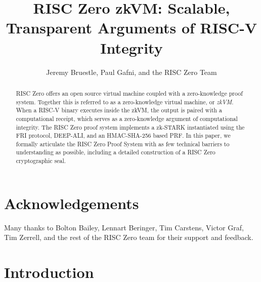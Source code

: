 \documentclass[10pt,letterpaper,titlepage]{article}
\author{Jeremy Bruestle, Paul Gafni, and the RISC Zero Team}
\title{RISC Zero zkVM: Scalable, Transparent Arguments of RISC-V Integrity}
\theoremstyle{definition}
\begin{document}
\maketitle
\begin{abstract}
RISC Zero offers an open source virtual machine coupled with a zero-knowledge proof system.
Together this is referred to as a zero-knowledge virtual machine, or \textit{zkVM}.
When a RISC-V binary executes inside the zkVM, the output is paired with a computational receipt, which serves as a zero-knowledge argument of computational integrity.
The RISC Zero proof system implements a zk-STARK instantiated using the FRI protocol, DEEP-ALI, and an HMAC-SHA-256 based PRF. 
In this paper, we formally articulate the RISC Zero Proof System with as few technical barriers to understanding as possible, including a detailed construction of a RISC Zero cryptographic seal.
\end{abstract}

\tableofcontents

\section*{Acknowledgements}
Many thanks to Bolton Bailey, Lennart Beringer, Tim Carstens, Victor Graf, Tim Zerrell, and the rest of the RISC Zero team for their support and feedback. 

\clearpage

\section{Introduction}
\label{introduction}
\end{document}
